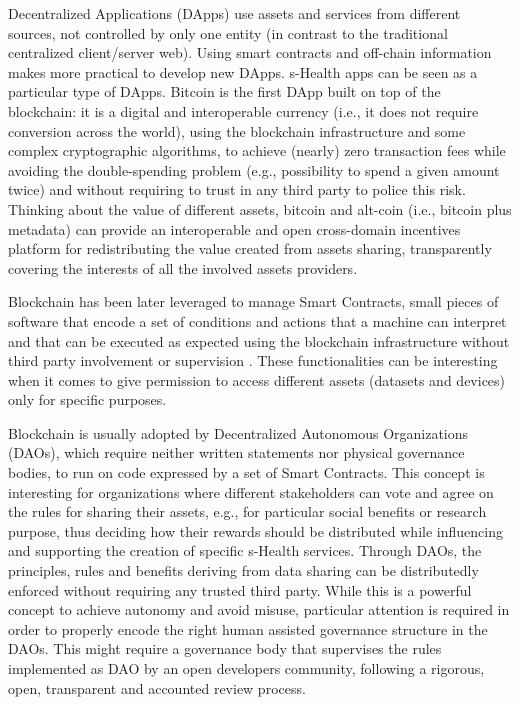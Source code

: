 \documentclass[conference]{IEEEtran}
\begin{document}
Decentralized Applications (DApps) use assets and services from different sources, not controlled by only one entity (in contrast to the traditional centralized client/server web). Using smart contracts and off-chain information makes more practical to develop new DApps. s-Health apps can be seen as a particular type of DApps. Bitcoin is the first DApp built on top of the blockchain: it is a digital and interoperable currency (i.e., it does not require conversion across the world), using the blockchain infrastructure and some complex cryptographic algorithms, to achieve (nearly) zero transaction fees while avoiding the double-spending problem (e.g., possibility to spend a given amount twice) and without requiring to trust in any third party to police this risk. Thinking about the value of different assets, bitcoin and alt-coin (i.e., bitcoin plus metadata) can provide an interoperable and open cross-domain incentives platform for redistributing the value created from assets sharing, transparently covering the interests of all the involved assets providers.

Blockchain has been later leveraged to manage Smart Contracts, small pieces of software that encode a set of conditions and actions that a machine can interpret and that can be executed as expected using the blockchain infrastructure without third party involvement or supervision \cite{Buterin2014}. These functionalities can be interesting when it comes to give permission to access different assets (datasets and devices) only for specific purposes.

Blockchain is usually adopted by Decentralized Autonomous Organizations (DAOs), which require neither written statements nor physical governance bodies, to run on code expressed by a set of Smart Contracts. This concept is interesting for organizations where different stakeholders can vote and agree on the rules for sharing their assets, e.g., for particular social benefits or research purpose, thus deciding how their rewards should be distributed while influencing and supporting the creation of specific s-Health services. Through DAOs, the principles, rules and benefits deriving from data sharing can be distributedly enforced without requiring any trusted third party. While this is a powerful concept to achieve autonomy and avoid misuse, particular attention is required in order to properly encode the right human assisted governance structure in the DAOs. This might require a governance body that supervises the rules implemented as DAO by an open developers community, following a rigorous, open, transparent and accounted review process.
\end{document}
